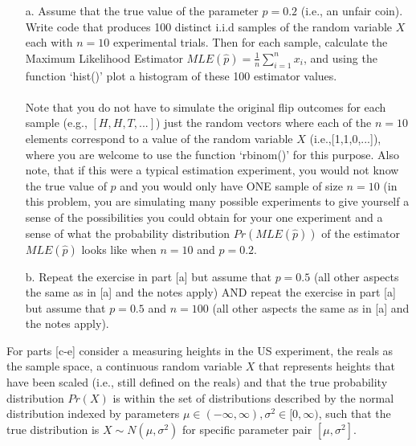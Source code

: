\documentclass[letterpaper, 11pt]{article}
\begin{document}
\begin{itemize}
\item[a.] Assume that the true value of the parameter $p=0.2$ (i.e., an unfair coin).  Write code that produces 100 distinct i.i.d samples of the random variable $X$ each with $n=10$ experimental trials.  Then for each sample, calculate the Maximum Likelihood Estimator $MLE(\hat{p})=\frac{1}{n}\sum_{i=1}^{n} x_i$, and using the function `hist()' plot a histogram of these 100 estimator values.\\
\\
Note that you do not have to simulate the original flip outcomes for each sample (e.g., $[H, H, T, ...]$) just the random vectors where each of the $n=10$ elements correspond to a value of the random variable $X$ (i.e.,[1,1,0,...]), where you are welcome to use the function `rbinom()' for this purpose.  Also note, that if this were a typical estimation experiment, you would not know the true value of $p$ and you would only have ONE sample of size $n=10$ (in this problem, you are simulating many possible experiments to give yourself a sense of the possibilities you could obtain for your one experiment and a sense of what the probability distribution $Pr(MLE(\hat{p}))$ of the estimator $MLE(\hat{p})$ looks like when $n=10$ and $p=0.2$.

\item[b.] Repeat the exercise in part [a] but assume that $p=0.5$ (all other aspects the same as in [a] and the notes apply) AND repeat the exercise in part [a] but assume that $p=0.5$ and $n=100$ (all other aspects the same as in [a] and the notes apply).\\

\end{itemize}

For parts [c-e] consider a measuring heights in the US experiment, the reals as the sample space, a continuous random variable $X$ that represents heights that have been scaled (i.e., still defined on the reals) and that the true probability distribution $Pr(X)$ is within the set of distributions described by the normal distribution indexed by parameters $\mu \in (-\infty,\infty), \sigma^2 \in [0,\infty)$, such that the true distribution is $X \sim N(\mu,\sigma^2)$ for specific parameter pair $[\mu,\sigma^2]$.
\end{document}
